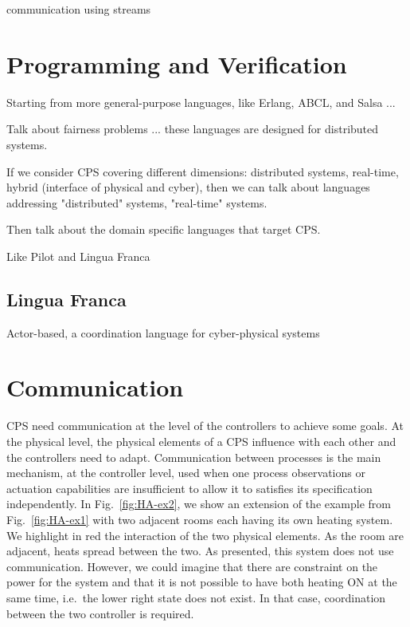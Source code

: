 \documentclass[
graybox,
envcountchap
]{svmult}
\begin{document}
\begin{bibunit}
    communication using streams
    
\section{Programming and Verification}\label{sec:Programming}

Starting from more general-purpose languages, like Erlang, ABCL, and Salsa ...

Talk about fairness problems ... these languages are designed for distributed systems.

If we consider CPS covering different dimensions: distributed systems, real-time, hybrid (interface of physical and cyber), then we can talk about languages addressing "distributed" systems,  "real-time" systems.

Then talk about the domain specific languages that target CPS.

Like Pilot and Lingua Franca

\subsection{Lingua Franca}
Actor-based, a coordination language for cyber-physical systems

\section{Communication}

CPS need communication at the level of the controllers to achieve some goals.
At the physical level, the physical elements of a CPS influence with each other and the controllers need to adapt.
Communication between processes is the main mechanism, at the controller level, used when one process observations or actuation capabilities are insufficient to allow it to satisfies its specification independently.
In Fig.~\ref{fig:HA-ex2}, we show an extension of the example from Fig.~\ref{fig:HA-ex1} with two adjacent rooms each having its own heating system.
We highlight in {\color{red!90!black}red} the interaction of the two physical elements.
As the room are adjacent, heats spread between the two.
As presented, this system does not use communication.
However, we could imagine that there are constraint on the power for the system and that it is not possible to have both heating ON at the same time, i.e.~the lower right state does not exist.
In that case, coordination between the two controller is required.



\end{bibunit}
\end{document}
